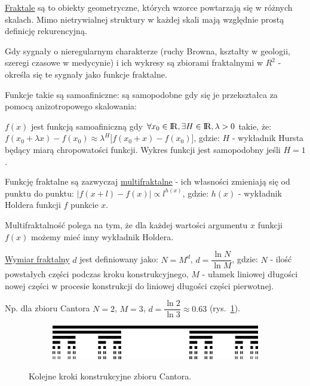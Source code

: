 \underline{Fraktale} są to obiekty geometryczne, których wzorce powtarzają się w różnych skalach. Mimo nietrywialnej struktury w każdej skali mają względnie prostą definicję rekurencyjną.

Gdy sygnały o nieregularnym charakterze (ruchy Browna, kształty w geologii, szeregi czasowe w medycynie) i ich wykresy są zbiorami fraktalnymi w $ R^2 $ - określa się te sygnały jako funkcje fraktalne.

Funkcje takie są samoafiniczne: są samopodobne gdy się je przekształca za pomocą anizotropowego skalowania:

$ f(x) $ jest funkcją samoafiniczną gdy $\forall x_0 \in {\rm I\!R},\space \exists H \in {\rm I\!R}, \lambda > 0 $ takie, że:\newline
$ f(x_0 + \lambda x) - f(x_0) \approx \lambda^H \big[ f(x_0+x) - f(x_0)\big] $, gdzie:\newline
$ H $ - wykładnik Hursta będący miarą chropowatości funkcji. Wykres funkcji jest samopodobny jeśli $ H = 1 $.

Funkcję fraktalne są zazwyczaj \underline{multifraktalne} - ich własności zmieniają się od punktu do punktu: \newline
$ |f(x+l) - f(x)| \propto l^{h(x)}$, gdzie:\newline
$ h(x) $ - wykładnik Holdera funkcji $ f $ punkcie $ x $.

Multifraktalność polega na tym, że dla każdej wartości argumentu $ x $ funkcji $ f(x) $ możemy mieć inny wykładnik Holdera.

\underline{Wymiar fraktalny} $ d $ jest definiowany jako:\newline
$ N = M^d $,\newline
$ d = \dfrac{\ln N}{\ln M} $, gdzie:\newline
$ N $ - ilość powstałych części podczas kroku konstrukcyjnego,\newline
$ M $ - ułamek liniowej długości nowej części w procesie konstrukcji do liniowej długości części pierwotnej.

Np. dla zbioru Cantora $ N = 2 $, $ M = 3 $, $ d = \dfrac{\ln 2}{\ln 3} \approx 0.63 $ (rys.~\ref{cantor}).
\begin{figure} [H]
	\centering
	\begin{subfigure}{.99\textwidth}
		\centering
		\includegraphics[width=1.0\linewidth]{EDMIIssues/Figures/cantor.png}
	\end{subfigure}
	\caption{Kolejne kroki konstrukcyjne zbioru Cantora.}
	\label{cantor}
\end{figure}

